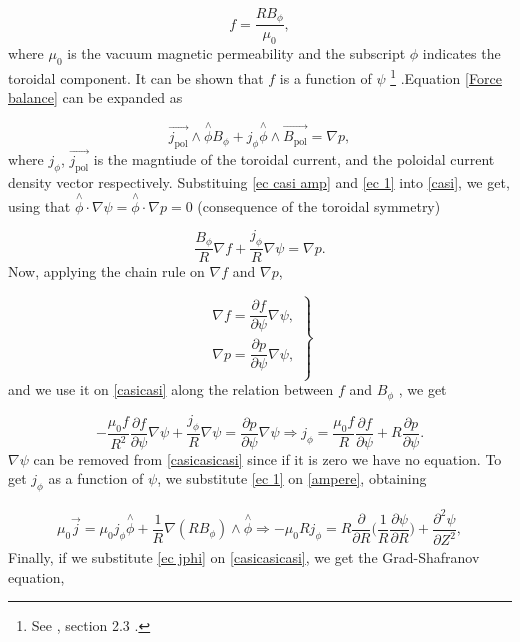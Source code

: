 \documentclass[a4paper,12pt,oneside]{book}
\newcommand{\p}{\partial}
\begin{document}
\begin{equation}
f=\dfrac{R B_\phi}{\mu_0},
\end{equation}
%
where $\mu_0$ is the vacuum magnetic permeability and the subscript $\phi$ indicates the toroidal component. It can be shown that $f$ is a function of $\psi$ \footnote{See \cite{Wesson}, section 2.3 .} .Equation \eqref{Force balance} can be expanded as

\begin{equation}\label{casi}
\vec{j_\text{pol}} \wedge \stackrel{\wedge}{\phi} B_\phi+j_\phi \stackrel{\wedge}{\phi} \wedge \vec{B_\text{pol}}=\nabla p,
\end{equation}
%
where $j_\phi$, $\vec{j_\text{pol}}$ is the magntiude of the toroidal current, and the poloidal current density vector respectively. Substituing \eqref{ec casi amp} and \eqref{ec 1} into \eqref{casi}, we get, using that $\stackrel{\wedge}{\phi} \cdot \nabla \psi=\stackrel{\wedge}{\phi} \cdot \nabla p=0$ (consequence of the toroidal symmetry)

\begin{equation}\label{casicasi}
\dfrac{B_\phi}{R} \nabla f + \dfrac{j_\phi}{R} \nabla \psi= \nabla p.
\end{equation}
Now, applying the chain rule on $\nabla f$ and $\nabla p$,

\begin{equation}
\left.
\begin{array}{c}
\nabla f=\dfrac{\p f}{\p \psi} \nabla \psi, \\
\nabla p=\dfrac{\p p}{\p \psi} \nabla \psi, \\
\end{array}
\right\}
\end{equation}
and we use it on \eqref{casicasi} along the relation between $f$ and $B_\phi$ , we get

\begin{equation}\label{casicasicasi}
-\dfrac{\mu_0 f}{R^2} \dfrac{\p f}{\p \psi} \nabla \psi + \dfrac{j_\phi}{R} \nabla \psi =  \dfrac{\p p}{\p \psi} \nabla \psi \Rightarrow j_\phi= \dfrac{\mu_0 f}{R} \dfrac{\p f}{\p \psi} +R\dfrac{\p p}{\p \psi}.
\end{equation}
$\nabla \psi$ can be removed from \eqref{casicasicasi} since if it is zero we have no equation.
To get $j_\phi$ as a function of $\psi$, we substitute \eqref{ec 1} on \eqref{ampere}, obtaining

\begin{equation}\label{ec jphi}
\begin{array}{c}
\mu_0 \vec{j}=\mu_0 j_\phi \stackrel{\wedge}{\phi}+\dfrac{1}{R} \nabla(R B_\phi) \wedge \stackrel{\wedge}{\phi} \Rightarrow
-\mu_0 R j_\phi=R \dfrac{\p }{\p R} \Big( \dfrac{1}{R} \dfrac{\p \psi}{\p R} \Big) +\dfrac{\p^2 \psi}{\p Z^2},
\end{array}
\end{equation}
%
Finally, if we substitute \eqref{ec jphi} on \eqref{casicasicasi}, we get the Grad-Shafranov equation,
\end{document}
